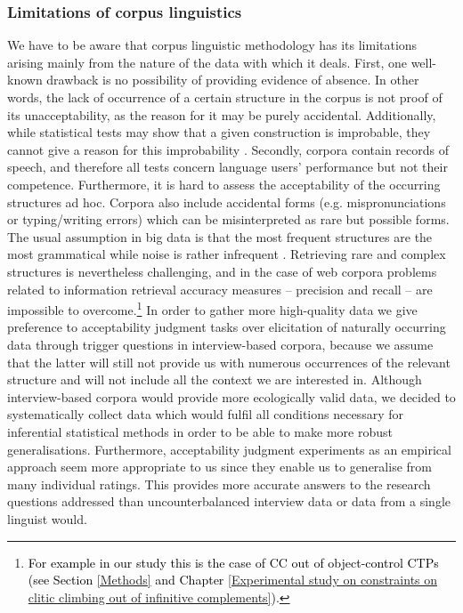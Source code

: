 \subsubsection{Limitations of corpus linguistics}
\label{Limitations of corpus linguistics}
We have to be aware that corpus linguistic methodology has its limitations arising mainly from the nature of the data with which it deals. First, one well-known drawback is no possibility of providing evidence of absence. In other words, the lack of occurrence of a certain structure in the corpus is not proof of its unacceptability, as the reason for it may be purely accidental. Additionally, while statistical tests may show that a given construction is improbable, they cannot give a reason for this improbability \citep[cf.][]{Stefanowitsch06}.
Secondly, corpora contain records of speech, and therefore all tests concern  language users’ performance but not their competence. Furthermore, it is hard to assess the acceptability of the occurring structures ad hoc. Corpora also include accidental forms (e.g. mispronunciations or typing/writing errors) which can be misinterpreted as rare but possible forms.
The usual assumption in big data is that the most frequent structures are the most grammatical while noise is rather infrequent \citep[9]{KilgarriffGrefenstette03}. Retrieving rare and complex structures is nevertheless challenging, and in the case of web corpora problems related to information retrieval accuracy measures – precision and recall – are impossible to overcome.\footnote{\textcolor{black}{For example in our study this is the case of CC out of object-control CTPs (see Section \ref{Methods} and Chapter \ref{Experimental study on constraints on clitic climbing out of infinitive complements}).}}
In order to gather more high-quality data we give preference to acceptability judgment tasks over elicitation of naturally occurring data through trigger questions in interview-based corpora, because we assume that the latter will still  not provide us with numerous occurrences of the relevant structure and will not include all the context we are interested in. Although interview-based corpora would provide more ecologically valid data, we decided to systematically collect data which would fulfil all conditions necessary for inferential statistical methods in order to be able to make more robust generalisations. Furthermore, acceptability judgment experiments as an empirical approach seem more appropriate to us since they enable us to generalise from many individual ratings. This provides more accurate answers to the research questions addressed than  uncounterbalanced interview data or data from a single linguist would.

